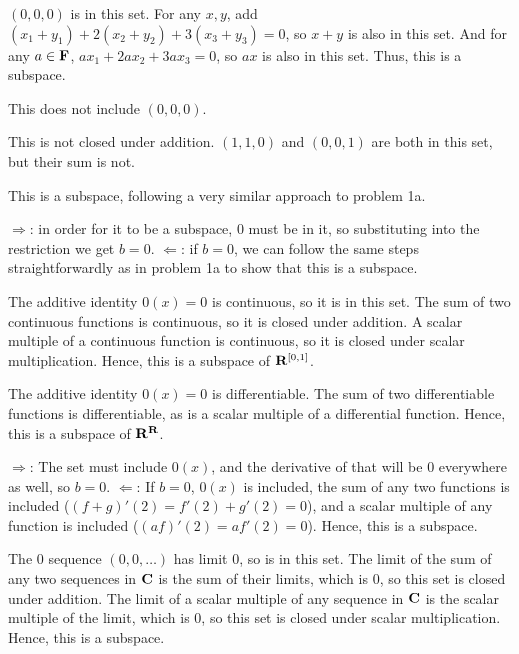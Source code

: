\documentclass{article}
\begin{document}

$(0,0,0)$ is in this set. For any $x, y$, add $(x_1 + y_1) + 2(x_2 + y_2) +
3(x_3 + y_3) = 0$, so $x+y$ is also in this set. And for any $a \in \mathbf{F}$,
$ax_1 + 2ax_2 + 3ax_3 = 0$, so $ax$ is also in this set. Thus, this is a
subspace.


This does not include $(0,0,0)$.


This is not closed under addition. $(1,1,0)$ and $(0,0,1)$ are both in this set,
but their sum is not.


This is a subspace, following a very similar approach to problem 1a.


$\Rightarrow$: in order for it to be a subspace, 0 must be in it, so
substituting into the restriction we get $b = 0$. $\Leftarrow$: if $b = 0$, we
can follow the same steps straightforwardly as in problem 1a to show that this
is a subspace.


The additive identity $0(x) = 0$ is continuous, so it is in this set. The sum of
two continuous functions is continuous, so it is closed under addition. A scalar
multiple of a continuous function is continuous, so it is closed under scalar
multiplication. Hence, this is a subspace of $\mathbf{R}^{[0, 1]}$.


The additive identity $0(x) = 0$ is differentiable. The sum of two
differentiable functions is differentiable, as is a scalar multiple of a
differential function. Hence, this is a subspace of $\mathbf{R}^{\mathbf{R}}$.


$\Rightarrow$: The set must include $0(x)$, and the derivative of that will be 0
everywhere as well, so $b = 0$. $\Leftarrow$: If $b = 0$, $0(x)$ is included,
the sum of any two functions is included ($(f+g)'(2) = f'(2) + g'(2) = 0$), and
a scalar multiple of any function is included ($(af)'(2) = af'(2) = 0$). Hence,
this is a subspace.


The 0 sequence $(0, 0, \ldots)$ has limit 0, so is in this set. The limit of the
sum of any two sequences in $\mathbf{C}$ is the sum of their limits, which is 0,
so this set is closed under addition. The limit of a scalar multiple of any
sequence in $\mathbf{C}$ is the scalar multiple of the limit, which is 0, so this
set is closed under scalar multiplication. Hence, this is a subspace.
\end{document}
